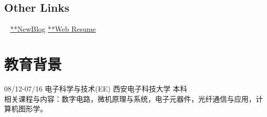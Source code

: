 \documentclass[]{friggeri-cv}
\begin{document}
\begin{aside}
  \section{Other Links}
    ~
    {\href{https://blog.mxuan.me}{**NewBlog}}
    {\href{https://resume.mxuan.me}{**Web Resume}}
   ~
   ~
\end{aside}




\section{教育背景}
08/12\hspace{1mm}-\hspace{1mm}07/16 \hspace{27mm} 电子科学与技术(EE) \hspace{7mm}  西安电子科技大学  \hspace{7mm}  本科 \\

相关课程与内容：数字电路，微机原理与系统，电子元器件，光纤通信与应用，计算机图形学。\\
\end{document}
